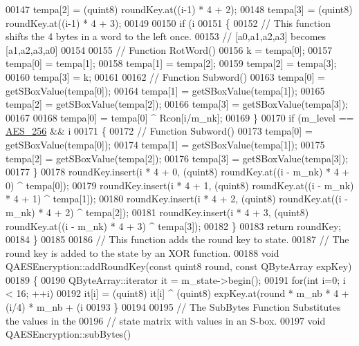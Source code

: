 \begin{DoxyCode}
00147     tempa[2] = (quint8) roundKey.at((i-1) * 4 + 2);
00148     tempa[3] = (quint8) roundKey.at((i-1) * 4 + 3);
00149 
00150     \textcolor{keywordflow}{if} (i %
00151     \{
00152         \textcolor{comment}{// This function shifts the 4 bytes in a word to the left once.}
00153         \textcolor{comment}{// [a0,a1,a2,a3] becomes [a1,a2,a3,a0]}
00154 
00155         \textcolor{comment}{// Function RotWord()}
00156         k = tempa[0];
00157         tempa[0] = tempa[1];
00158         tempa[1] = tempa[2];
00159         tempa[2] = tempa[3];
00160         tempa[3] = k;
00161 
00162         \textcolor{comment}{// Function Subword()}
00163         tempa[0] = getSBoxValue(tempa[0]);
00164         tempa[1] = getSBoxValue(tempa[1]);
00165         tempa[2] = getSBoxValue(tempa[2]);
00166         tempa[3] = getSBoxValue(tempa[3]);
00167 
00168         tempa[0] =  tempa[0] ^ Rcon[i/m\_nk];
00169     \}
00170     \textcolor{keywordflow}{if} (m\_level == \hyperlink{class_q_a_e_s_encryption_abe48208f4f6c7d68e6a10b49b9d0b7bdacde97774ab1d4c609e04b0dd13a1e1f7}{AES\_256} && i %
00171     \{
00172         \textcolor{comment}{// Function Subword()}
00173         tempa[0] = getSBoxValue(tempa[0]);
00174         tempa[1] = getSBoxValue(tempa[1]);
00175         tempa[2] = getSBoxValue(tempa[2]);
00176         tempa[3] = getSBoxValue(tempa[3]);
00177     \}
00178     roundKey.insert(i * 4 + 0, (quint8) roundKey.at((i - m\_nk) * 4 + 0) ^ tempa[0]);
00179     roundKey.insert(i * 4 + 1, (quint8) roundKey.at((i - m\_nk) * 4 + 1) ^ tempa[1]);
00180     roundKey.insert(i * 4 + 2, (quint8) roundKey.at((i - m\_nk) * 4 + 2) ^ tempa[2]);
00181     roundKey.insert(i * 4 + 3, (quint8) roundKey.at((i - m\_nk) * 4 + 3) ^ tempa[3]);
00182   \}
00183   \textcolor{keywordflow}{return} roundKey;
00184 \}
00185 
00186 \textcolor{comment}{// This function adds the round key to state.}
00187 \textcolor{comment}{// The round key is added to the state by an XOR function.}
00188 \textcolor{keywordtype}{void} QAESEncryption::addRoundKey(\textcolor{keyword}{const} quint8 round, \textcolor{keyword}{const} QByteArray expKey)
00189 \{
00190   QByteArray::iterator it = m\_state->begin();
00191   \textcolor{keywordflow}{for}(\textcolor{keywordtype}{int} i=0; i < 16; ++i)
00192       it[i] = (quint8) it[i] ^ (quint8) expKey.at(round * m\_nb * 4 + (i/4) * m\_nb + (i%
00193 \}
00194 
00195 \textcolor{comment}{// The SubBytes Function Substitutes the values in the}
00196 \textcolor{comment}{// state matrix with values in an S-box.}
00197 \textcolor{keywordtype}{void} QAESEncryption::subBytes()

\end{DoxyCode}
